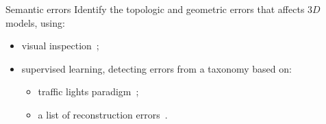 \documentclass{beamer}
\begin{document}
            \begin{frame}{Semantic errors}
                Identify the topologic and geometric errors that affects $3D$ models, using:
                \begin{itemize}[label=$\blacktriangleright$, font=\color{IGNGreen}]
                    \item<1-> visual inspection~\citep{OudeElberink2010};
                    \item<2-> supervised learning, detecting errors from a taxonomy based on:
                    \begin{itemize}[label=--]
                        \item<3-> traffic lights paradigm~\citep{boudet2006supervised};
                        \item<4-> a list of reconstruction errors~\citep{Michelin2013}.
                    \end{itemize}
                \end{itemize}
            \end{frame}
\end{document}
